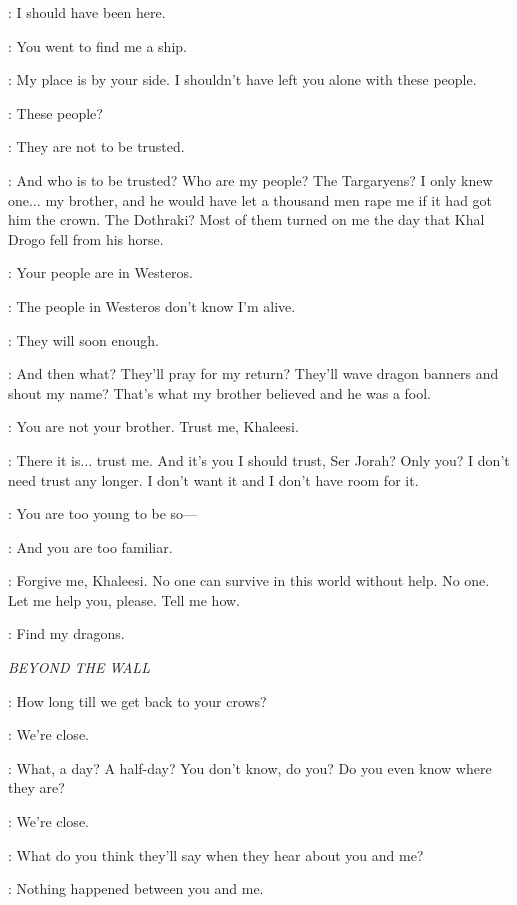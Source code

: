 \JORAH: I should have been here.

\DAENERYS: You went to find me a ship.

\JORAH: My place is by your side. I shouldn't have left you alone with these people.

\DAENERYS: These people?

\JORAH: They are not to be trusted.

\DAENERYS: And who is to be trusted? Who are my people? The Targaryens? I only knew one$\ldots$ my brother, and he would have let a thousand men rape me if it had got him the crown. The Dothraki? Most of them turned on me the day that Khal Drogo fell from his horse.

\JORAH: Your people are in Westeros.

\DAENERYS: The people in Westeros don't know I'm alive.

\JORAH: They will soon enough.

\DAENERYS: And then what? They'll pray for my return? They'll wave dragon banners and shout my name? That's what my brother believed and he was a fool.

\JORAH: You are not your brother. Trust me, Khaleesi.

\DAENERYS: There it is$\ldots$ trust me. And it's you I should trust, Ser Jorah? Only you? I don't need trust any longer. I don't want it and I don't have room for it.

\JORAH:  You are too young to be so---

\DAENERYS: And you are too familiar.

\JORAH: Forgive me, Khaleesi. No one can survive in this world without help. No one. Let me help you, please. Tell me how.

\DAENERYS: Find my dragons.


\scene

\textit{BEYOND THE WALL}


\YGRITTE: How long till we get back to your crows?

\JON: We're close.

\YGRITTE: What, a day? A half-day? You don't know, do you? Do you even know where they are?

\JON: We're close.

\YGRITTE: What do you think they'll say when they hear about you and me?

\JON: Nothing happened between you and me.

